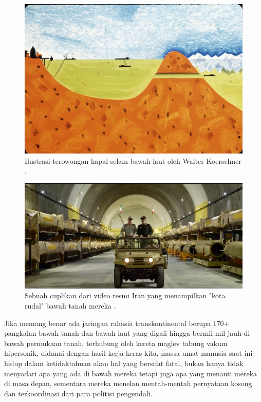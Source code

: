 \documentclass[10pt,twocolumn,letterpaper]{article}
\begin{document}
\begin{figure}[t]
\begin{center}
   \includegraphics[width=1\linewidth]{sub.jpg}
\end{center}
   \caption{Ilustrasi terowongan kapal selam bawah laut oleh Walter Koerschner \cite{22,23}.}
\label{fig:6}
\label{fig:onecol}

\end{figure}

\begin{figure}[t]
\begin{center}
   \includegraphics[width=1\linewidth]{iran.jpeg}
\end{center}
   \caption{Sebuah cuplikan dari video resmi Iran yang menampilkan "kota rudal" bawah tanah mereka \cite{39,40}.}
\label{fig:12}
\label{fig:onecol}
\end{figure}

Jika memang benar ada jaringan rahasia transkontinental berupa 170+ pangkalan bawah tanah dan bawah laut yang digali hingga bermil-mil jauh di bawah permukaan tanah, terhubung oleh kereta maglev tabung vakum hipersonik, didanai dengan hasil kerja keras kita, massa umat manusia saat ini hidup dalam ketidaktahuan akan hal yang bersifat fatal, bukan hanya tidak menyadari apa yang ada di bawah mereka tetapi juga apa yang menanti mereka di masa depan, sementara mereka menelan mentah-mentah pernyataan kosong dan terkoordinasi dari para politisi pengendali.
\end{document}
